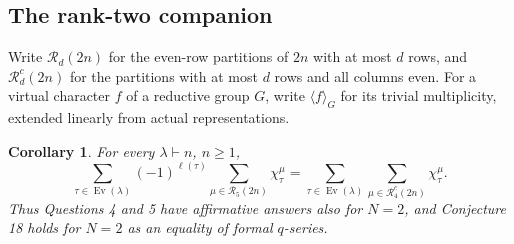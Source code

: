 \documentclass[11pt]{article}
\newcommand{\Ev}{\operatorname{Ev}}
\newtheorem{corollary}[theorem]{Corollary}
\begin{document}
\subsection*{The rank-two companion}
Write $\mathcal R_d(2n)$ for the even-row partitions of $2n$ with at most
$d$ rows, and $\mathcal R_d^c(2n)$ for the partitions with at most $d$
rows and all columns even.
For a virtual character $f$ of a reductive group $G$, write
$\langle f\rangle_G$ for its trivial multiplicity, extended linearly
from actual representations.

\begin{corollary}\label{cor:ranktwo}
For every $\lambda\vdash n$, $n\geq1$,
\[
 \sum_{\tau\in\Ev(\lambda)}(-1)^{\ell(\tau)}
        \sum_{\mu\in\mathcal R_5(2n)}\chi^\mu_\tau
 =\sum_{\tau\in\Ev(\lambda)}
        \sum_{\mu\in\mathcal R_4^c(2n)}\chi^\mu_\tau.
\]
Thus Questions 4 and 5 have affirmative answers also for $N=2$, and
Conjecture 18 holds for $N=2$ as an equality of formal $q$-series.
\end{corollary}
\end{document}

